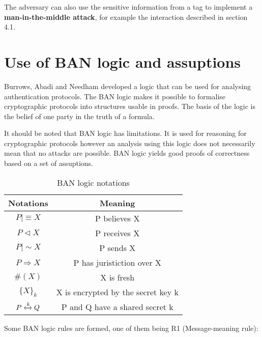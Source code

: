     The adversary can also use the sensitive information from a tag to implement a \textbf{man-in-the-middle attack}, for example the 
    interaction described in section 4.1.

\section{Use of BAN logic and assuptions}
    Burrows, Abadi and Needham developed a logic that can be used for analysing authentication protocols. The BAN logic makes it possible
    to formalise cryptographic protocols into structures usable in proofs. The basis of the logic is the belief of one party in the truth
    of a formula. 

    It should be noted that BAN logic has limitations. It is used for reasoning for cryptographic protocols however an analysis using this
    logic does not necessarily mean that no attacks are possible. BAN logic yields good proofs of correctness based on a set of assuptions.

    \newcommand{\believes}{\mid\equiv}
    \newcommand{\receives}{\triangleleft}
    \newcommand{\sends}{\mid\sim}
    \newcommand{\controls}{\Rightarrow}
    \newcommand{\fresh}[1]{\#(#1)}
    \newcommand{\encrypt}[2]{\{#1\}_{#2}}
    \newcommand{\sharesecret}[1]{\xleftrightarrow{#1}}

    \begin{table}[H]
    \centering
    \caption{BAN logic notations}
    \begin{tabular}{| c | c |}
        \hline
        Notations & Meaning \\
        \hline
        $P \believes X$ & P believes X \\
        $P \receives X$ & P receives X \\
        $P \sends X$ & P sends X \\
        $P \controls X$ & P has juristiction over X \\
        $ \fresh{X} $ & X is fresh \\
        $ \encrypt{X}{k} $ & X is encrypted by the secret key k \\
        $ P \sharesecret{k} Q $ & P and Q have a shared secret k \\
        \hline
    \end{tabular}
    \end{table}

    Some BAN logic rules are formed, one of them being R1 (Message-meaning rule): 
    
